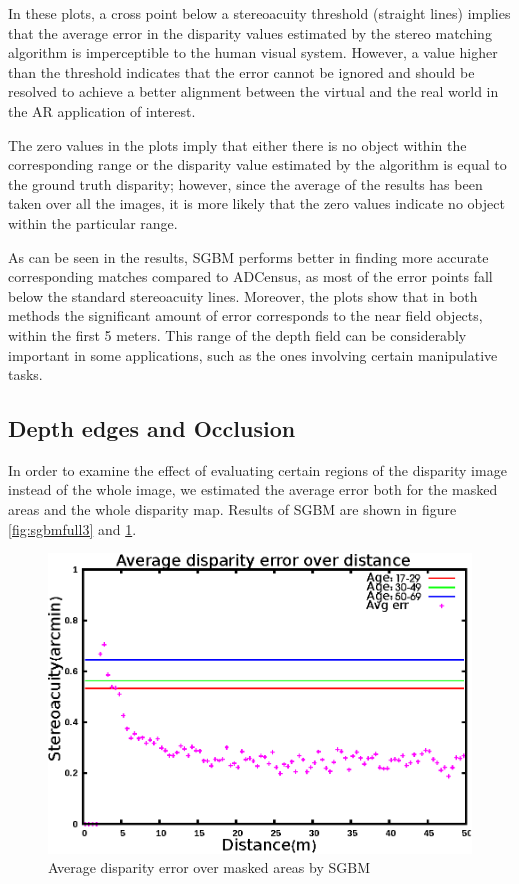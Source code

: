 In these plots, a cross point below a stereoacuity threshold (straight lines) implies that the average error in the disparity values estimated 
by the stereo matching 
algorithm is imperceptible to the human visual system. However, a value higher than the threshold indicates that
the error cannot be ignored and should be resolved to achieve a better alignment between the virtual and the 
real world in the AR application of interest.

The zero values in the plots imply that either there is no object within the corresponding range or the disparity value estimated by the algorithm
is equal to the ground truth disparity; however, since the average of the results has been taken over all the images, it is more likely that 
the zero values indicate no object within the particular range.

As can be seen in the results, SGBM performs better in finding more accurate corresponding matches 
compared to ADCensus, as most of the error points fall below the standard stereoacuity lines. Moreover, the plots show that in both methods 
the significant amount of error
corresponds to the near field objects, within the first 5 meters. This range of the depth field can be considerably important in some applications,
such as the ones involving certain manipulative tasks.

\subsection{Depth edges and Occlusion}
In order to examine the effect of evaluating certain regions of the disparity image instead of the whole image, 
we estimated the average error both for the masked areas and the whole disparity map. 
Results of SGBM are shown in figure \ref{fig:sgbmfull3} and \ref{fig:sgbmmsk3}.

\begin{figure}[H]
\centering
\includegraphics[scale=0.8]{sgbmmsk3}
\caption{Average disparity error over masked areas by SGBM}
\label{fig:sgbmmsk3}
\end{figure} 

